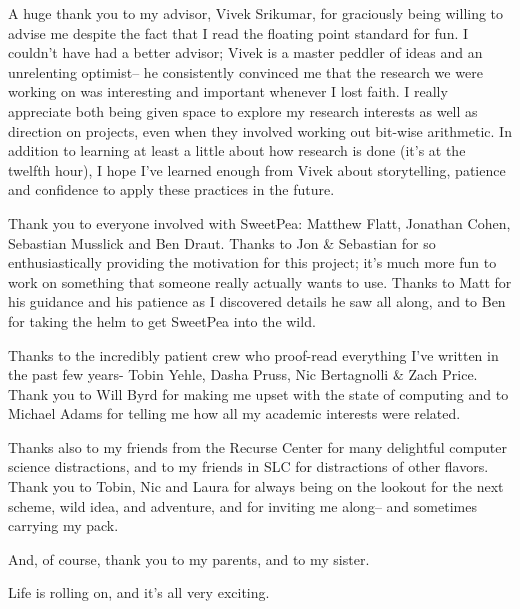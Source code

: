 
A huge thank you to my advisor, Vivek Srikumar, for graciously being willing to advise me despite the fact that I read the floating point standard for fun. I couldn't have had a better advisor; Vivek is a master peddler of ideas and an unrelenting optimist-- he consistently convinced me that the research we were working on was interesting and important whenever I lost faith. I really appreciate both being given space to explore my research interests as well as direction on projects, even when they involved working out bit-wise arithmetic. In addition to learning at least a little about how research is done (it's at the twelfth hour), I hope I've learned enough from Vivek about storytelling, patience and confidence to apply these practices in the future.

Thank you to everyone involved with SweetPea: Matthew Flatt, Jonathan Cohen, Sebastian Musslick and Ben Draut. Thanks to Jon \& Sebastian for so enthusiastically providing the motivation for this project; it's much more fun to work on something that someone really actually wants to use. Thanks to Matt for his guidance and his patience as I discovered details he saw all along, and to Ben for taking the helm to get SweetPea into the wild.

Thanks to the incredibly patient crew who proof-read everything I've written in the past few years- Tobin Yehle, Dasha Pruss, Nic Bertagnolli \& Zach Price. Thank you to Will Byrd for making me upset with the state of computing and to Michael Adams for telling me how all my academic interests were related.

Thanks also to my friends from the Recurse Center for many delightful computer science distractions, and to my friends in SLC for distractions of other flavors. Thank you to Tobin, Nic and Laura for always being on the lookout for the next scheme, wild idea, and adventure, and for inviting me along-- and sometimes carrying my pack.

And, of course, thank you to my parents, and to my sister.

Life is rolling on, and it's all very exciting.
